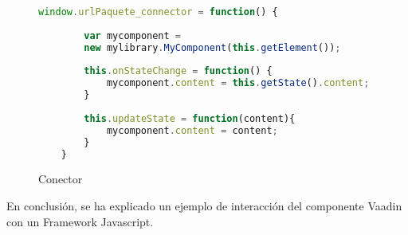 \begin{figure}[!tb]
	\centering
	\begin{lstlisting}[language=JavaScript]
	window.urlPaquete_connector = function() {
	
		var mycomponent = 
		new mylibrary.MyComponent(this.getElement());
		
		this.onStateChange = function() {
			mycomponent.content = this.getState().content;
		}
		
		this.updateState = function(content){
			mycomponent.content = content;
		}
	}\end{lstlisting}
	\caption{Conector}
	\label{fig:conectorDesc}
\end{figure}

En conclusión, se ha explicado un ejemplo de interacción del componente Vaadin con un Framework Javascript.